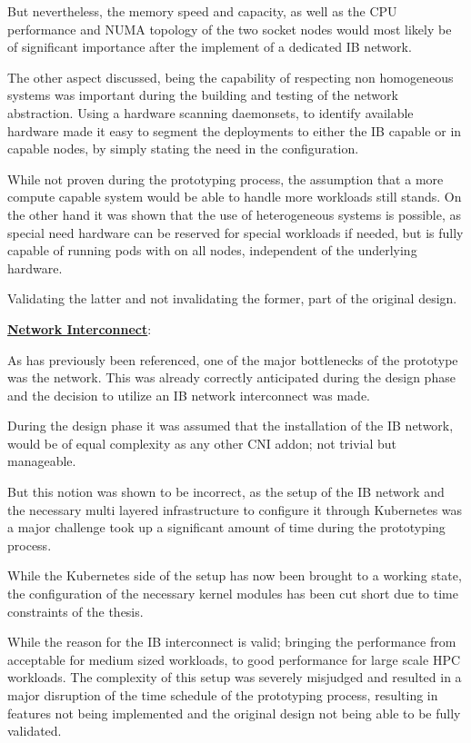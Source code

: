 But nevertheless, the memory speed and capacity, as well as the \ac{CPU} performance and \ac{NUMA}
topology of the two socket nodes would most likely be of significant importance
after the implement of a dedicated \ac{IB} network.

The other aspect discussed, being the capability of respecting non homogeneous
systems was important during the building and testing of the network abstraction.
Using a hardware scanning daemonsets, to identify available hardware made it
easy to segment the deployments to either the \ac{IB} capable or in capable nodes,
by simply stating the need in the configuration.

While not proven during the prototyping process, the assumption that a
more compute capable system would be able to handle more workloads still stands.
On the other hand it was shown that the use of heterogeneous systems is possible,
as special need hardware can be reserved for special workloads if needed,
but is fully capable of running pods with on all nodes, independent of
the underlying hardware.

Validating the latter and not invalidating the former, part of the original design.

\textbf{\hyperref[sec:suggarch_network]{Network Interconnect}}:
\label{par:network_interconnect}

As has previously been referenced, one of the major bottlenecks of the prototype was
the network. This was already correctly anticipated during the design phase and
the decision to utilize an \ac{IB} network interconnect was made.

During the design phase it was assumed that the installation of the \ac{IB} network,
would be of equal complexity as any other \ac{CNI} addon; not trivial but manageable.

But this notion was shown to be incorrect, as the setup of the \ac{IB} network
and the necessary multi layered infrastructure to configure it through Kubernetes
was a major challenge took up a significant amount of time during the prototyping process.

While the Kubernetes side of the setup has now been brought to a working state,
the configuration of the necessary kernel modules has been cut short due to
time constraints of the thesis.

While the reason for the \ac{IB} interconnect is valid; bringing the performance from
acceptable for medium sized workloads, to good performance for large scale \ac{HPC} workloads.
The complexity of this setup was severely misjudged and resulted in a major disruption
of the time schedule of the prototyping process, resulting in features not being implemented
and the original design not being able to be fully validated.

